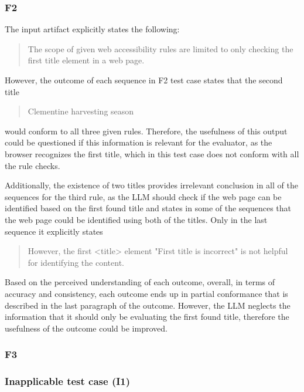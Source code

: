 \subsubsection{F2}

The input artifact explicitly states the following: \blockquote{The scope of given web accessibility rules are limited to only checking the first title element in a web page.}. However, the outcome of each sequence in F2 test case states that the second title \blockquote{Clementine harvesting season} would conform to all three given rules. Therefore, the usefulness of this output could be questioned if this information is relevant for the evaluator, as the browser recognizes the first title, which in this test case does not conform with all the rule checks.

Additionally, the existence of two titles provides irrelevant conclusion in all of the sequences for the third rule, as the LLM should check if the web page can be identified based on the first found title and states in some of the sequences that the web page could be identified using both of the titles. Only in the last sequence it explicitly states \blockquote{However, the first <title> element "First title is incorrect" is not helpful for identifying the content.}

Based on the perceived understanding of each outcome, overall, in terms of accuracy and consistency, each outcome ends up in partial conformance that is described in the last paragraph of the outcome. However, the LLM neglects the information that it should only be evaluating the first found title, therefore the usefulness of the outcome could be improved.

\subsubsection{F3}

\subsubsection{Inapplicable test case (I1)}